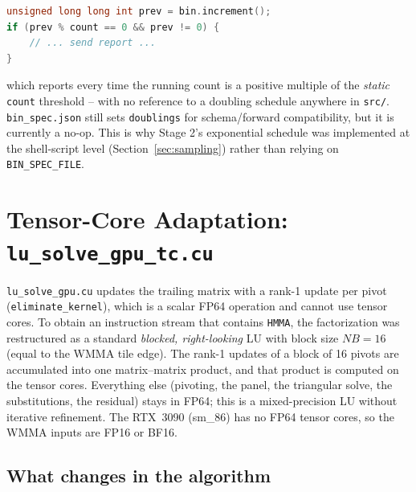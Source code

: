 \documentclass[11pt,a4paper]{article}
\begin{document}
\begin{lstlisting}[language=C++]
unsigned long long int prev = bin.increment();
if (prev % count == 0 && prev != 0) {
    // ... send report ...
}
\end{lstlisting}

which reports every time the running count is a positive multiple of the
\emph{static} \texttt{count} threshold -- with no reference to a doubling
schedule anywhere in \texttt{src/}. \texttt{bin\_spec.json} still sets
\texttt{doublings} for schema/forward compatibility, but it is currently a
no-op. This is why Stage 2's exponential schedule was implemented at the
shell-script level (Section~\ref{sec:sampling}) rather than relying on
\texttt{BIN\_SPEC\_FILE}.

\section{Tensor-Core Adaptation: \texttt{lu\_solve\_gpu\_tc.cu}}
\label{sec:tc}

\texttt{lu\_solve\_gpu.cu} updates the trailing matrix with a rank-1
update per pivot (\texttt{eliminate\_kernel}), which is a scalar FP64
operation and cannot use tensor cores. To obtain an instruction stream that
contains \texttt{HMMA}, the factorization was restructured as a standard
\emph{blocked, right-looking} LU with block size $NB=16$ (equal to the WMMA tile
edge). The rank-1 updates of a block of 16 pivots are accumulated into one
matrix--matrix product, and that product is computed on the tensor cores.
Everything else (pivoting, the panel, the triangular solve,
the substitutions, the residual) stays in FP64; this is a mixed-precision LU
without iterative refinement. The RTX~3090 (sm\_86) has no FP64 tensor cores,
so the WMMA inputs are FP16 or BF16.

\subsection{What changes in the algorithm}
\end{document}

